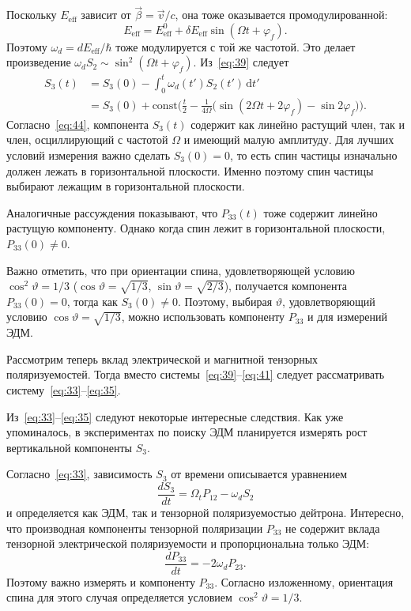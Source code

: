 \documentclass[11pt,a4paper]{article}
\begin{document}
Поскольку $E_{\mathrm{eff}}$ зависит от $\vec{\beta}=\vec{v}/c$, она тоже
оказывается промодулированной:
\begin{equation}
E_{\mathrm{eff}}=E_{\mathrm{eff}}^0+\delta E_{\mathrm{eff}}\sin(\Omega t+\varphi_f).
\label{eq:43}
\end{equation}
Поэтому $\omega_d=d E_{\mathrm{eff}}/\hbar$ тоже модулируется с той же
частотой. Это делает произведение $\omega_d S_2\sim\sin^2(\Omega t+\varphi_f)$.
Из~\eqref{eq:39} следует
\begin{equation}
\begin{aligned}
S_3(t)
&=S_3(0)-\int_0^t\omega_d(t')S_2(t')\,\mathrm{d}t'\\
&=S_3(0)+\mathrm{const}\Biggl(
\frac{t}{2}-\frac{1}{4\Omega}\bigl(\sin(2\Omega t+2\varphi_f)-\sin 2\varphi_f\bigr)
\Biggr).
\end{aligned}
\label{eq:44}
\end{equation}
Согласно~\eqref{eq:44}, компонента $S_3(t)$ содержит как линейно растущий
член, так и член, осциллирующий с частотой $\Omega$ и имеющий малую амплитуду.
Для лучших условий измерения важно сделать $S_3(0)=0$, то есть спин частицы
изначально должен лежать в горизонтальной плоскости. Именно поэтому спин
частицы выбирают лежащим в горизонтальной плоскости.

Аналогичные рассуждения показывают, что $P_{33}(t)$ тоже содержит линейно
растущую компоненту. Однако когда спин лежит в горизонтальной плоскости,
$P_{33}(0)\ne 0$.

Важно отметить, что при ориентации спина, удовлетворяющей условию
$\cos^2\vartheta=1/3$
($\cos\vartheta=\sqrt{1/3}$, $\sin\vartheta=\sqrt{2/3}$),
получается компонента $P_{33}(0)=0$, тогда как $S_3(0)\ne 0$.
Поэтому, выбирая $\vartheta$, удовлетворяющий условию
$\cos\vartheta=\sqrt{1/3}$, можно использовать компоненту $P_{33}$
и для измерений ЭДМ.

Рассмотрим теперь вклад электрической и магнитной тензорных поляризуемостей.
Тогда вместо системы~\eqref{eq:39}--\eqref{eq:41} следует рассматривать
систему~\eqref{eq:33}--\eqref{eq:35}.

Из~\eqref{eq:33}--\eqref{eq:35} следуют некоторые интересные следствия.
Как уже упоминалось, в экспериментах по поиску ЭДМ планируется измерять
рост вертикальной компоненты $S_3$.

Согласно~\eqref{eq:33}, зависимость $S_3$ от времени описывается уравнением
\begin{equation}
\frac{dS_3}{dt}=\Omega_t P_{12}-\omega_d S_2
\label{eq:45}
\end{equation}
и определяется как ЭДМ, так и тензорной поляризуемостью дейтрона.
Интересно, что производная компоненты тензорной поляризации $P_{33}$
не содержит вклада тензорной электрической поляризуемости и пропорциональна
только ЭДМ:
\begin{equation}
\frac{dP_{33}}{dt}=-2\omega_d P_{23}.
\label{eq:46}
\end{equation}
Поэтому важно измерять и компоненту $P_{33}$. Согласно изложенному,
ориентация спина для этого случая определяется условием
$\cos^2\vartheta=1/3$.
\end{document}
